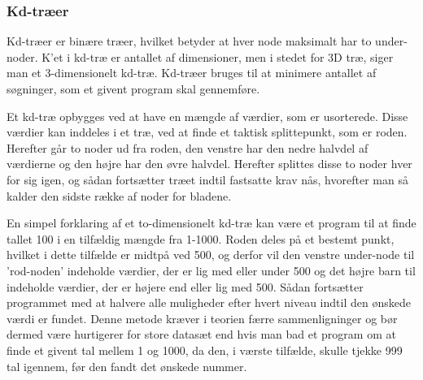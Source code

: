 \subsubsection{Kd-træer}
\label{sec:kdtree}

Kd-træer er binære træer, hvilket betyder at hver node maksimalt har to under-noder. K'et i kd-træ er antallet af dimensioner, men i stedet for 3D træ, siger man et 3-dimensionelt kd-træ. Kd-træer bruges til at minimere antallet af søgninger, som et givent program skal gennemføre. 

Et kd-træ opbygges ved at have en mængde af værdier, som er usorterede. Disse værdier kan inddeles i et træ, ved at finde et taktisk splittepunkt, som er roden. Herefter går to noder ud fra roden, den venstre har den nedre halvdel af værdierne og den højre har den øvre halvdel. Herefter splittes disse to noder hver for sig igen, og sådan fortsætter træet indtil fastsatte krav nås, hvorefter man så kalder den sidste række af noder for bladene. 

En simpel forklaring af et to-dimensionelt kd-træ kan være et program til at finde tallet 100 i en tilfældig mængde fra 1-1000. Roden deles på et bestemt punkt, hvilket i dette tilfælde er midtpå ved 500, og derfor vil den venstre under-node til 'rod-noden' indeholde værdier, der er lig med eller under 500 og det højre barn til indeholde værdier, der er højere end eller lig med 500. Sådan fortsætter programmet med at halvere alle muligheder efter hvert niveau indtil den ønskede værdi er fundet. Denne metode kræver i teorien færre sammenligninger og bør dermed være hurtigerer for store datasæt end hvis man bad et program om at finde et givent tal mellem 1 og 1000, da den, i værste tilfælde, skulle tjekke 999 tal igennem, før den fandt det ønskede nummer.

